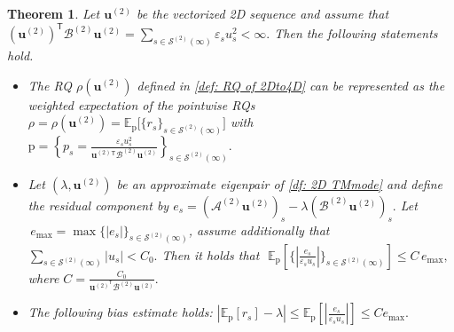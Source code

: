 \documentclass[11pt]{article}
\newtheorem{thm}{Theorem}[section]
\numberwithin{equation}{section}
\begin{document}
\begin{thm} \label{thm: 2Dto4D Rayleigh quotient}
Let $\boldsymbol{u}^{(2)}$ be the vectorized 2D sequence and assume that $(\boldsymbol{u}^{(2)})^{\mathsf T} \mathcal{B}^{(2)} \boldsymbol{u}^{(2)}
=
\sum_{s\in\mathcal{S}^{(2)}(\infty)} \varepsilon_s u_s^2 <\infty .$
Then the following statements hold.
    \begin{itemize}
\item[(i)]  The RQ $\rho(\boldsymbol{u}^{(2)})$ defined in \eqref{def: RQ of 2Dto4D} can be represented as the weighted expectation of the pointwise RQs
$ \rho = \rho(\boldsymbol{u}^{(2)}) = \mathbb{E}_\mathrm{p}\Big[ \{ r_{s} \}_{s\in\mathcal{S}^{(2)}(\infty)} \Big]$
with $ \mathrm{p} = \left\{ p_{s} =
\frac{\varepsilon_{s} u_{s}^2}{\boldsymbol{u}^{(2)}\!^\mathsf{T} \mathcal{B}^{(2)} \boldsymbol{u}^{(2)}}
\right\}_{s\in\mathcal{S}^{(2)}(\infty)}. $

\item[(ii)] Let $(\lambda, \boldsymbol{u}^{(2)})$ be an approximate eigenpair of \eqref{df: 2D TMmode} and define the residual component by $e_{s} = (\mathcal{A}^{(2)} \boldsymbol{u}^{(2)})_{s} - \lambda (\mathcal{B}^{(2)} \boldsymbol{u}^{(2)})_{s}.$ Let $\, e_{\max} = \max \{|e_{s}|\}_{s\in\mathcal{S}^{(2)}(\infty)}$, assume additionally that $ \sum_{s\in\mathcal{S}^{(2)}(\infty)} |u_{s}| < C_0. $ Then it holds that $\,\, \mathbb{E}_\mathrm{p}\!\left[ \Big\{ \left| \frac{e_{s}}{\varepsilon_{s} u_{s}} \right| \Big\}_{s\in\mathcal{S}^{(2)}(\infty)} \right]
\le C\, e_{\max}, $
where $ C = \frac{C_0}{\boldsymbol{u}^{(2)^\mathsf{T}} \mathcal{B}^{(2)} \boldsymbol{u}^{(2)}}.$
\item[(iii)] The following bias estimate holds:
$
\left| \mathbb{E}_\mathrm{p}[r_{s}] - \lambda \right|
\le
\mathbb{E}_\mathrm{p}\!\left[ \left| \frac{e_{s}}{\varepsilon_{s} u_{s}} \right| \right]
\le C e_{\max}. $
\end{itemize}
\end{thm}
\end{document}
